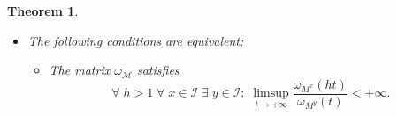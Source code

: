 \documentclass[10pt]{amsart}%
\numberwithin{equation}{section}
\theoremstyle{plain}
\newtheorem{theorem}[proposition]{Theorem}
\newcommand{\RR}{\mathbb{R}}
\newcommand{\NN}{\mathbb{N}}
\begin{document}
\begin{theorem}
\begin{itemize}
\begin{itemize}
\item[$(v)$] The matrix $\mathcal{M}^{(2)}$ does satisfy
\begin{equation*}%
\forall\;x\in\mathcal{I}\;\forall\;C> 1\;\exists\;y\in\mathcal{I}\;\exists\;B>0\;\forall\;a>0\;\exists\;D>0\;\forall\;j\in\NN:\;\;\; C^jM_j^{x;a}\le D M_j^{y;Ba}.
\end{equation*}

\item[$(vi)$] The matrix $\mathcal{M}^{(2)}$ does satisfy
\begin{equation}\label{naturalitycor1roumnewnew}
\forall\;x\in\mathcal{I}\;\forall\;C> 1\;\forall\;a>0\;\exists\;y\in\mathcal{I}\;\exists\;b>0\;\exists\;D>0\;\forall\;j\in\NN:\;\;\;C^jM^{x;a}_j\le DM^{y;b}_j.
\end{equation}

\item[$(vii)$] The matrix $\mathcal{M}^{(2)}$ does satisfy
\begin{equation}\label{naturalitycor1new1}
   \forall\;r>1\;\forall\;x\in\mathcal{I}\;\exists\;y\in\mathcal{I}\;\exists\;b>0:\;\;\; \liminf_{j\in\NN_{>0}}\frac{\exp(\frac{1}{bj}\varphi^{*}_{\omega_{M^y}}(bj))}{\exp(\frac{1}{j}\varphi^{*}_{\omega_{M^x}}(j))}>r.
\end{equation}

\item[$(viii)$] The matrix $\mathcal{M}^{(2)}$ does satisfy
\begin{equation}\label{naturalitycor1new1real}
   \forall\;r>1\;\forall\;x\in\mathcal{I}\;\exists\;y\in\mathcal{I}\;\exists\;b>0:\;\;\; \liminf_{j\in\RR_{>0}}\frac{\exp(\frac{1}{bj}\varphi^{*}_{\omega_{M^y}}(bj))}{\exp(\frac{1}{j}\varphi^{*}_{\omega_{M^x}}(j))}>r.
\end{equation}
\end{itemize}

\item[$(II)$]  The following conditions are equivalent:

\begin{itemize}
\item[$(i)$] The matrix $\omega_{\mathcal{M}}$ satisfies
\begin{equation*}%
\forall\;h>1\;\forall\;x\in\mathcal{I}\;\exists\;y\in\mathcal{I}:
\;\limsup_{t\rightarrow+\infty}\frac{\omega_{M^x}(ht)}{\omega_{M^y}(t)}<+\infty.
\end{equation*}


\end{itemize}
\end{itemize}
\end{theorem}
\end{document}
